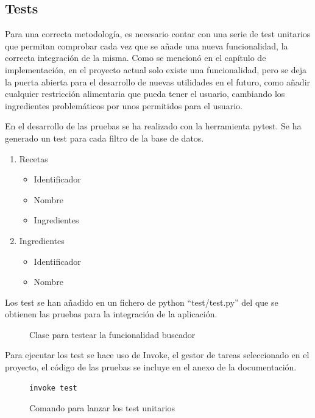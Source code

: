 \subsection{Tests}
Para una correcta metodología, es necesario contar con una serie de test unitarios que permitan comprobar cada vez que se añade una nueva funcionalidad, la correcta integración de la misma. Como se mencionó en el capítulo de implementación, en el proyecto actual solo existe una funcionalidad, pero se deja la puerta abierta para el desarrollo de nuevas utilidades en el futuro, como añadir cualquier restricción alimentaria que pueda tener el usuario, cambiando los ingredientes problemáticos por unos permitidos para el usuario. 

En el desarrollo de las pruebas se ha realizado con la herramienta pytest. Se ha generado un \gls{test} para cada filtro de la base de datos.
\begin{enumerate}
    \item Recetas
    \begin{itemize}
        \item Identificador
        \item Nombre
        \item Ingredientes
    \end{itemize}
    \item Ingredientes
    \begin{itemize}
        \item Identificador
        \item Nombre
    \end{itemize}
\end{enumerate}

Los \gls{test} se han añadido en un fichero de python ``test/test.py'' del que se obtienen las pruebas para la integración de la aplicación.
\begin{figure}[h!]
    \centering
    \caption{Clase para testear la funcionalidad buscador}
    \label{fig:test}
\end{figure}

Para ejecutar los \gls{test} se hace uso de Invoke, el gestor de tareas seleccionado en el proyecto, el código de las pruebas se incluye en el anexo de la documentación. 

\begin{figure}
    \centering
    \begin{lstlisting}[style=consola]
        invoke test
    \end{lstlisting}
    \caption{Comando para lanzar los test unitarios}
    \label{cmd:test}
\end{figure}